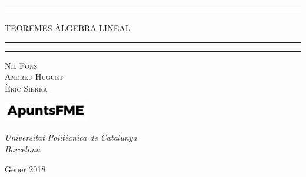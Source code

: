 \newcommand{\plogo}{\fbox{$\mathcal{PL}$}} %
{

    \centering %

    \scshape %

    \rule{\textwidth}{1.6pt}\vspace*{-\baselineskip}\vspace*{2pt} %
    \rule{\textwidth}{0.4pt} %

    \vspace{0.40\baselineskip} %

    {\LARGE TEOREMES ÀLGEBRA LINEAL} %

    \vspace{0.01\baselineskip} %

    \rule{\textwidth}{0.4pt}\vspace*{-\baselineskip}\vspace{3.2pt} %
    \rule{\textwidth}{1.6pt} %

    \vspace{0.5\baselineskip} %

    {\scshape\large Nil Fons \\ Andreu Huguet \\ Èric Sierra\\} %

    \vspace{1.5\baselineskip} %

    \includegraphics[width=3.7cm]{../logo.pdf}

    \vspace{-0.3\baselineskip} %
    
    \textit{Universitat Politècnica de Catalunya \\ Barcelona} %
        

    Gener 2018 %

}
